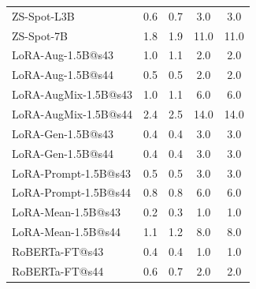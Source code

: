 \begin{table}[t]
\begin{tabular}{lcccc}
ZS-Spot-L3B & 0.6 & 0.7 & 3.0 & 3.0 \\
ZS-Spot-7B & 1.8 & 1.9 & 11.0 & 11.0 \\
LoRA-Aug-1.5B@s43 & 1.0 & 1.1 & 2.0 & 2.0 \\
LoRA-Aug-1.5B@s44 & 0.5 & 0.5 & 2.0 & 2.0 \\
LoRA-AugMix-1.5B@s43 & 1.0 & 1.1 & 6.0 & 6.0 \\
LoRA-AugMix-1.5B@s44 & 2.4 & 2.5 & 14.0 & 14.0 \\
LoRA-Gen-1.5B@s43 & 0.4 & 0.4 & 3.0 & 3.0 \\
LoRA-Gen-1.5B@s44 & 0.4 & 0.4 & 3.0 & 3.0 \\
LoRA-Prompt-1.5B@s43 & 0.5 & 0.5 & 3.0 & 3.0 \\
LoRA-Prompt-1.5B@s44 & 0.8 & 0.8 & 6.0 & 6.0 \\
LoRA-Mean-1.5B@s43 & 0.2 & 0.3 & 1.0 & 1.0 \\
LoRA-Mean-1.5B@s44 & 1.1 & 1.2 & 8.0 & 8.0 \\
RoBERTa-FT@s43 & 0.4 & 0.4 & 1.0 & 1.0 \\
RoBERTa-FT@s44 & 0.6 & 0.7 & 2.0 & 2.0 \\
\bottomrule
\end{tabular}
\end{table}